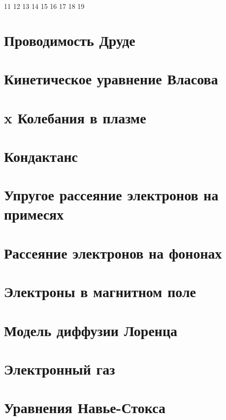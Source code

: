 11 12 13 14 15 16 17 18 19





\section*{Проводимость Друде}


\section{Кинетическое уравнение Власова}


\section{x Колебания в плазме}


\section{Кондактанс}


\section{Упругое рассеяние электронов на примесях}


\section{Рассеяние электронов на фононах}


\section{Электроны в магнитном поле}


\section{Модель диффузии Лоренца}


\section{Электронный газ}


\section{Уравнения Навье-Стокса}





